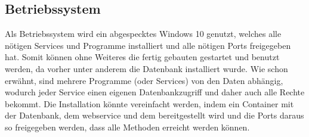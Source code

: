 \subsection{Betriebssystem}\label{subsec:betriebssystem}
	Als Betriebssystem wird ein abgespecktes Windows 10 genutzt,
	welches alle nötigen Services und Programme installiert
	und alle nötigen Ports freigegeben hat.
	Somit können ohne Weiteres
	die fertig gebauten  gestartet
	und benutzt werden,
	da vorher unter anderem die Datenbank installiert wurde.
	Wie schon erwähnt,
	sind mehrere Programme (oder Services) von den Daten abhängig,
	wodurch jeder Service einen eigenen Datenbankzugriff und daher auch alle Rechte bekommt.
	Die Installation könnte vereinfacht werden,
	indem ein Container mit der Datenbank, dem \gls{webservice}
	und dem  bereitgestellt wird
	und die Ports daraus so freigegeben werden,
	dass alle Methoden erreicht werden können.